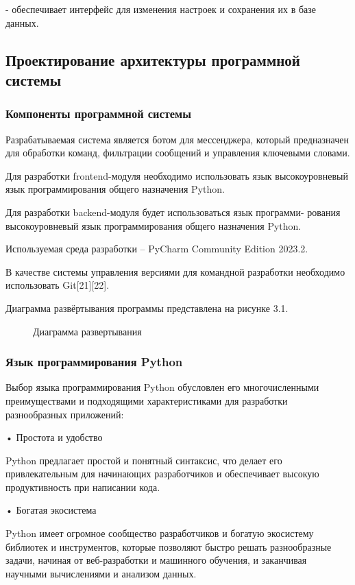 - обеспечивает интерфейс для изменения настроек и сохранения их в базе данных.



\subsection{Проектирование архитектуры программной системы}
\subsubsection{Компоненты программной системы}
Разрабатываемая система является ботом для мессенджера, который предназначен для обработки команд, фильтрации сообщений и управления ключевыми словами.

Для разработки frontend-модуля необходимо использовать язык высокоуровневый язык программирования общего назначения Python.

Для разработки backend-модуля будет использоваться язык программи- рования высокоуровневый язык программирования общего назначения Python.

Используемая среда разработки – PyCharm Community Edition 2023.2.

В качестве системы управления версиями для командной разработки необходимо использовать Git[21][22].

Диаграмма развёртывания программы представлена на рисунке 3.1.
\begin{figure}
	\center{\texttt{[image: un4]}}
	\caption{Диаграмма развертывания}
	\label{un4:image}
\end{figure}


\subsubsection{Язык программирования Python}

Выбор языка программирования Python обусловлен его многочисленными преимуществами и подходящими характеристиками для разработки разнообразных приложений:

• Простота и удобство 

Python предлагает простой и понятный синтаксис, что делает его привлекательным для начинающих разработчиков и обеспечивает высокую продуктивность при написании кода.

• Богатая экосистема

Python имеет огромное сообщество разработчиков и богатую экосистему библиотек и инструментов, которые позволяют быстро решать разнообразные задачи, начиная от веб-разработки и машинного обучения, и заканчивая научными вычислениями и анализом данных.

